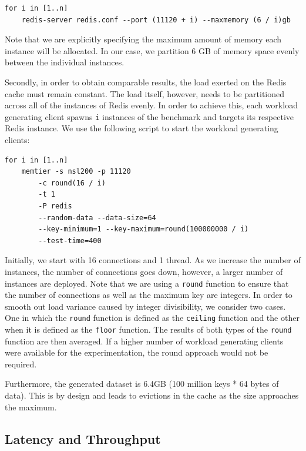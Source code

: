 \begin{lstlisting}
for i in [1..n]
    redis-server redis.conf --port (11120 + i) --maxmemory (6 / i)gb
\end{lstlisting}

Note that we are explicitly specifying the maximum amount of memory each instance will be allocated. In our case, we partition 6 GB of memory space evenly between the individual instances.

Secondly, in order to obtain comparable results, the load exerted on the Redis cache must remain constant. The load itself, however, needs to be partitioned across all of the instances of Redis evenly. In order to achieve this, each workload generating client spawns \texttt{i} instances of the benchmark and targets its respective Redis instance. We use the following script to start the workload generating clients:

\begin{lstlisting}
for i in [1..n]
    memtier -s nsl200 -p 11120
        -c round(16 / i)
        -t 1
        -P redis
        --random-data --data-size=64
        --key-minimum=1 --key-maximum=round(100000000 / i)
        --test-time=400
\end{lstlisting}

Initially, we start with 16 connections and 1 thread. As we increase the number of instances, the number of connections goes down, however, a larger number of instances are deployed. Note that we are using a \texttt{round} function to ensure that the number of connections as well as the maximum key are integers. In order to smooth out load variance caused by integer divisibility, we consider two cases. One in which the \texttt{round} function is defined as the \texttt{ceiling} function and the other when it is defined as the \texttt{floor} function. The results of both types of the \texttt{round} function are then averaged. If a higher number of workload generating clients were available for the experimentation, the round approach would not be required.

Furthermore, the generated dataset is 6.4GB (100 million keys * 64 bytes of data). This is by design and leads to evictions in the cache as the size approaches the maximum.


\subsection{Latency and Throughput}

